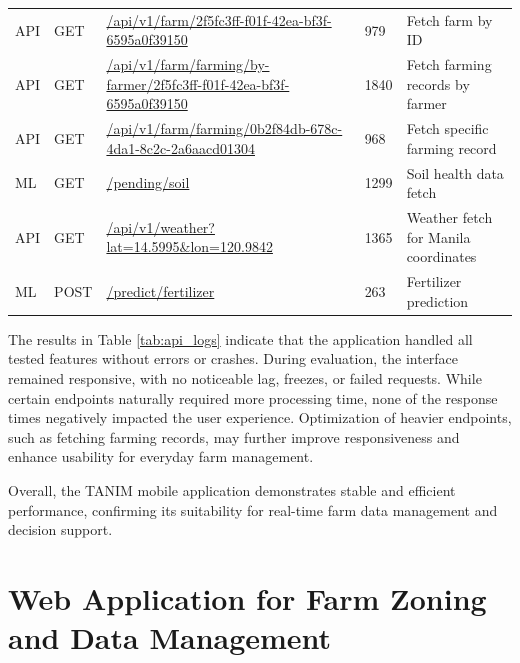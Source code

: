 {\begin{table}[H]
\begin{tabularx}{\textwidth}{l l X l p{3.5cm}}
			\addlinespace[3pt]
			
			API & GET & \url{/api/v1/farm/2f5fc3ff-f01f-42ea-bf3f-6595a0f39150} & 979 & Fetch farm by ID \\
			
			\addlinespace[3pt]
			
			API & GET & \url{/api/v1/farm/farming/by-farmer/2f5fc3ff-f01f-42ea-bf3f-6595a0f39150} & 1840 & Fetch farming records by farmer \\
			
			\addlinespace[3pt]
			
			API & GET & \url{/api/v1/farm/farming/0b2f84db-678c-4da1-8c2c-2a6aacd01304} & 968 & Fetch specific farming record \\
			
			\addlinespace[3pt]
			
			ML & GET & \url{/pending/soil} & 1299 & Soil health data fetch \\
			
			\addlinespace[3pt]
			
			API & GET & \url{/api/v1/weather?lat=14.5995&lon=120.9842} & 1365 & Weather fetch for Manila coordinates \\
			
			\addlinespace[3pt]
			
			ML & POST & \url{/predict/fertilizer} & 263 & Fertilizer prediction \\
			
			\bottomrule
		\end{tabularx}
		
	\end{table}
	
	The results in Table \ref{tab:api_logs} indicate that the application handled all tested features without errors or crashes. During evaluation, the interface remained responsive, with no noticeable lag, freezes, or failed requests. While certain endpoints naturally required more processing time, none of the response times negatively impacted the user experience. Optimization of heavier endpoints, such as fetching farming records, may further improve responsiveness and enhance usability for everyday farm management.
	
	Overall, the TANIM mobile application demonstrates stable and efficient performance, confirming its suitability for real-time farm data management and decision support.
	
	
	\section{Web Application for Farm Zoning and Data Management}
	
}
